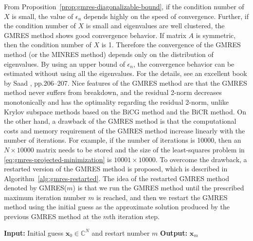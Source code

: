 {From Proposition\ \ref{prop:gmres-diagonalizable-bound}, if the condition number of $X$ is small, the value of $\epsilon_n$ depends highly on the speed of convergence. Further, if the condition number of $X$ is small and eigenvalues are well clustered, the GMRES method shows good convergence behavior. If matrix $A$ is symmetric, then the condition number of $X$ is 1. Therefore the convergence of the GMRES method (or the MINRES method) depends only on the distribution of eigenvalues. By using an upper bound of $\epsilon_n$, the convergence behavior can be estimated without using all the eigenvalues. For the details, see an excellent book by Saad , pp.206--207.}
{Nice features of the GMRES method are that the GMRES method never suffers from breakdown, and the residual 2-norm decreases monotonically and has the optimality regarding the residual 2-norm, unlike Krylov subspace methods based on the BiCG method and the BiCR method. On the other hand, a drawback of the GMRES method is that the computational costs and memory requirement of the GMRES method increase linearly with the number of iterations. For example, if the number of iterations is 10000, then an $N\times10000$ matrix needs to be stored and the size of the least-squares problem in \eqref{eq:gmres-projected-minimization} is $10001\times10000$. To overcome the drawback, a restarted version of the GMRES method is proposed, which is described in Algorithm\ \ref{alg:gmres-restarted}.}
{The idea of the restarted GMRES method denoted by GMRES($m$) is that we run the GMRES method until the prescribed maximum iteration number $m$ is reached, and then we restart the GMRES method using the initial guess as the approximate solution produced by the previous GMRES method at the $m$th iteration step.}
\begin{algorithm}[H]\caption{{The GMRES($m$) method}}\label{alg:gmres-restarted}\begin{algorithmic}[1]
\Statex\textbf{Input:} {Initial guess $\bm x_0\in\mathbb C^N$ and restart number $m$}
\Statex\textbf{Output:} $\bm x_m$
\EndWhile\end{algorithmic}\end{algorithm}
